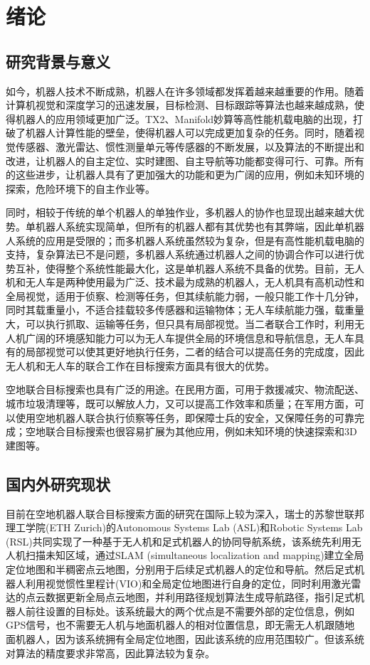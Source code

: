 
\chapter{绪论}
\section{研究背景与意义}
如今，机器人技术不断成熟，机器人在许多领域都发挥着越来越重要的作用。随着计算机视觉和深度学习的迅速发展，目标检测、目标跟踪等算法也越来越成熟，使得机器人的应用领域更加广泛。TX2、Manifold妙算等高性能机载电脑的出现，打破了机器人计算性能的壁垒，使得机器人可以完成更加复杂的任务。同时，随着视觉传感器、激光雷达、惯性测量单元等传感器的不断发展，以及算法的不断提出和改进，让机器人的自主定位、实时建图、自主导航等功能都变得可行、可靠。所有的这些进步，让机器人具有了更加强大的功能和更为广阔的应用，例如未知环境的探索，危险环境下的自主作业等。

同时，相较于传统的单个机器人的单独作业，多机器人的协作也显现出越来越大优势。单机器人系统实现简单，但所有的机器人都有其优势也有其弊端，因此单机器人系统的应用是受限的；而多机器人系统虽然较为复杂，但是有高性能机载电脑的支持，复杂算法已不是问题，多机器人系统通过机器人之间的协调合作可以进行优势互补，使得整个系统性能最大化，这是单机器人系统不具备的优势。目前，无人机和无人车是两种使用最为广泛、技术最为成熟的机器人，无人机具有高机动性和全局视觉，适用于侦察、检测等任务，但其续航能力弱，一般只能工作十几分钟，同时其载重量小，不适合挂载较多传感器和运输物体；无人车续航能力强，载重量大，可以执行抓取、运输等任务，但只具有局部视觉。当二者联合工作时，利用无人机广阔的环境感知能力可以为无人车提供全局的环境信息和导航信息，无人车具有的局部视觉可以使其更好地执行任务，二者的结合可以提高任务的完成度，因此无人机和无人车的联合工作在目标搜索方面具有很大的优势。

空地联合目标搜索也具有广泛的用途。在民用方面，可用于救援减灾、物流配送、城市垃圾清理等，既可以解放人力，又可以提高工作效率和质量；在军用方面，可以使用空地机器人联合执行侦察等任务，即保障士兵的安全，又保障任务的可靠完成；空地联合目标搜索也很容易扩展为其他应用，例如未知环境的快速探索和3D建图等。

\section{国内外研究现状}
目前在空地机器人联合目标搜索方面的研究在国际上较为深入，瑞士的苏黎世联邦理工学院(ETH Zurich)的Autonomous Systems Lab (ASL)和Robotic Systems Lab (RSL)共同实现了一种基于无人机和足式机器人的协同导航系统，该系统先利用无人机扫描未知区域，通过SLAM (simultaneous localization and mapping)建立全局定位地图和半稠密点云地图，分别用于后续足式机器人的定位和导航。然后足式机器人利用视觉惯性里程计(VIO)和全局定位地图进行自身的定位，同时利用激光雷达的点云数据更新全局点云地图，并利用路径规划算法生成导航路径，指引足式机器人前往设置的目标处。该系统最大的两个优点是不需要外部的定位信息，例如GPS信号，也不需要无人机与地面机器人的相对位置信息，即无需无人机跟随地面机器人，因为该系统拥有全局定位地图，因此该系统的应用范围较广。但该系统对算法的精度要求非常高，因此算法较为复杂。

